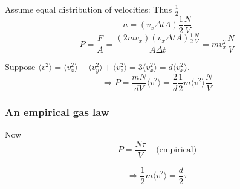 Assume equal distribution of velocities: Thus $\frac{1}{2}$
\[
 n = (v_x \Delta t A) \frac{1}{2} \frac{N}{V}
\]
\[
P = \frac{F}{A} = \frac{ (2mv_x)(v_x \Delta t A ) \frac{1}{2} \frac{N}{V} }{ A \Delta t} = mv_x^2 \frac{N}{V}
\]

Suppose $\langle v^2 \rangle = \langle v_x^2 \rangle + \langle v_y^2 \rangle + \langle v_z^2 \rangle = 3 \langle v_x^2 \rangle = d \langle v_x^2 \rangle$.  
\[
\Longrightarrow P = \frac{mN}{dV} \langle v^2 \rangle = \frac{2}{d} \frac{1}{2} m \langle v^2 \rangle \frac{N}{V}
\]

\subsubsection*{An empirical gas law}
Now 
\[
P = \frac{N\tau}{V} \quad \, \text{(empirical)}
\]

\[
\Longrightarrow \frac{1}{2} m \langle v^2 \rangle = \frac{d}{2} \tau
\]


